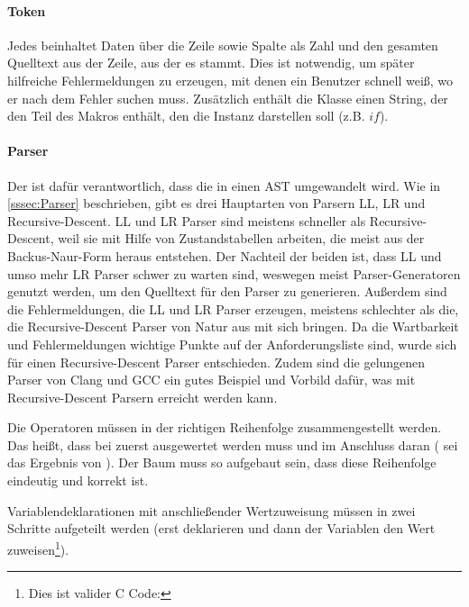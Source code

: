       \paragraph{Token}
        Jedes  beinhaltet Daten über die Zeile sowie Spalte als Zahl und den gesamten Quelltext aus der Zeile, aus der es stammt. Dies ist notwendig, um später hilfreiche Fehlermeldungen zu erzeugen, mit denen ein Benutzer schnell weiß, wo er nach dem Fehler suchen muss. Zusätzlich enthält die Klasse einen String, der den Teil des Makros enthält, den die Instanz darstellen soll (z.B. \myMIn$if$).

      \paragraph{Parser}
        Der  ist dafür verantwortlich, dass die  in einen AST umgewandelt wird. Wie in \autoref{sssec:Parser} beschrieben, gibt es drei Hauptarten von Parsern LL, LR und Recursive-Descent. LL und LR Parser sind meistens schneller als Recursive-Descent, weil sie mit Hilfe von Zustandstabellen arbeiten, die meist aus der Backus-Naur-Form heraus entstehen. Der Nachteil der beiden ist, dass LL und umso mehr LR Parser schwer zu warten sind, weswegen meist Parser-Generatoren genutzt werden, um den Quelltext für den Parser zu generieren. Außerdem sind die Fehlermeldungen, die LL und LR Parser erzeugen, meistens schlechter als die, die Recursive-Descent Parser von Natur aus mit sich bringen\autocite{scott2010gll}. Da die Wartbarkeit und Fehlermeldungen wichtige Punkte auf der Anforderungsliste sind, wurde sich für einen Recursive-Descent Parser entschieden. Zudem sind die gelungenen Parser von Clang\autocite{clang-feat} und GCC\autocite{gcc-new-parser} ein gutes Beispiel und Vorbild dafür, was mit Recursive-Descent Parsern erreicht werden kann.

        Die Operatoren müssen in der richtigen Reihenfolge zusammengestellt werden. Das heißt, dass bei  zuerst  ausgewertet werden muss und im Anschluss daran  ( sei das Ergebnis von ). Der Baum muss so aufgebaut sein, dass diese Reihenfolge eindeutig und korrekt ist.

        Variablendeklarationen mit anschließender Wertzuweisung müssen in zwei Schritte aufgeteilt werden (erst deklarieren und dann der Variablen den Wert zuweisen\footnote{
          Dies ist valider C Code: 
        }).

